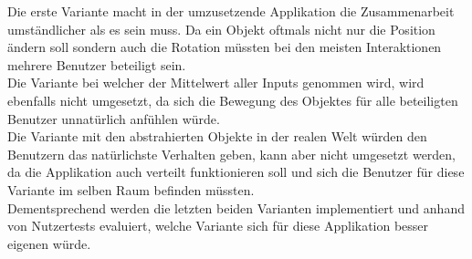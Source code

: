 \bigskip
Die erste Variante macht in der umzusetzende Applikation die Zusammenarbeit umständlicher als es sein muss. Da ein Objekt oftmals nicht nur die Position ändern soll sondern auch die Rotation müssten bei den meisten Interaktionen mehrere Benutzer beteiligt sein. \\
Die Variante bei welcher der Mittelwert aller Inputs genommen wird, wird ebenfalls nicht umgesetzt, da sich die Bewegung des Objektes für alle beteiligten Benutzer unnatürlich anfühlen würde. \\
Die Variante mit den abstrahierten Objekte in der realen Welt würden den Benutzern das natürlichste Verhalten geben, kann aber nicht umgesetzt werden, da die Applikation auch verteilt funktionieren soll und sich die Benutzer für diese Variante im selben Raum befinden müssten. \\
Dementsprechend werden die letzten beiden Varianten implementiert und anhand von Nutzertests evaluiert, welche Variante sich für diese Applikation besser eigenen würde.

